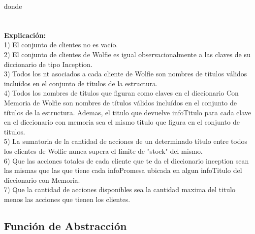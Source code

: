 donde \\
	\\\\

\textbf{Explicaci\'on:} \\
1) El conjunto de clientes no es vac\'io. \\
2) El conjunto de clientes de Wolfie es igual observacionalmente a las claves de su diccionario de tipo Inception. \\
3) Todos los nt asociados a cada cliente de Wolfie son nombres de t\'itulos v\'alidos inclu\'idos en el conjunto de t\'itulos de la estructura. \\
4) Todos los nombres de t\'itulos que figuran como claves en el diccionario Con Memoria de Wolfie son nombres de t\'itulos v\'alidos inclu\'idos en el conjunto de t\'itulos de la estructura. Ademas, el titulo que devuelve infoTitulo para cada clave en el diccionario con memoria sea el mismo titulo que figura en el conjunto de titulos.\\
5) La sumatoria de la cantidad de acciones de un determinado t\'itulo entre todos los clientes de Wolfie nunca supera el l\'imite de "stock" del mismo. \\
6) Que las acciones totales de cada cliente que te da el diccionario inception sean las mismas que las que tiene cada infoPromesa ubicada en algun infoTitulo del diccionario con Memoria.\\
7) Que la cantidad de acciones disponibles sea la cantidad maxima del titulo menos las acciones que tienen los clientes.\\




\subsection{Funci\'on de Abstracci\'on}

